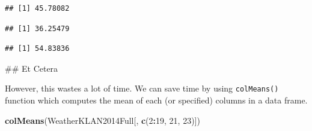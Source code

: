 \documentclass[]{article}
\newenvironment{Shaded}{\begin{snugshade}}{\end{snugshade}}
\newcommand{\KeywordTok}[1]{\textcolor[rgb]{0.13,0.29,0.53}{\textbf{#1}}}
\newcommand{\DecValTok}[1]{\textcolor[rgb]{0.00,0.00,0.81}{#1}}
\newcommand{\OperatorTok}[1]{\textcolor[rgb]{0.81,0.36,0.00}{\textbf{#1}}}
\newcommand{\NormalTok}[1]{#1}
\begin{document}
\begin{verbatim}
## [1] 45.78082
\end{verbatim}

\begin{Shaded}
\end{Shaded}

\begin{verbatim}
## [1] 36.25479
\end{verbatim}

\begin{Shaded}
\end{Shaded}

\begin{verbatim}
## [1] 54.83836
\end{verbatim}

\begin{Shaded}
\begin{Highlighting}[]
\NormalTok{## Et Cetera}
\end{Highlighting}
\end{Shaded}

However, this wastes a lot of time. We can save time by using
\texttt{colMeans()} function which computes the mean of each (or
specified) columns in a data frame.

\begin{Shaded}
\begin{Highlighting}[]
\KeywordTok{colMeans}\NormalTok{(WeatherKLAN2014Full[, }\KeywordTok{c}\NormalTok{(}\DecValTok{2}\OperatorTok{:}\DecValTok{19}\NormalTok{, }\DecValTok{21}\NormalTok{, }\DecValTok{23}\NormalTok{)])}
\end{Highlighting}
\end{Shaded}
\end{document}

